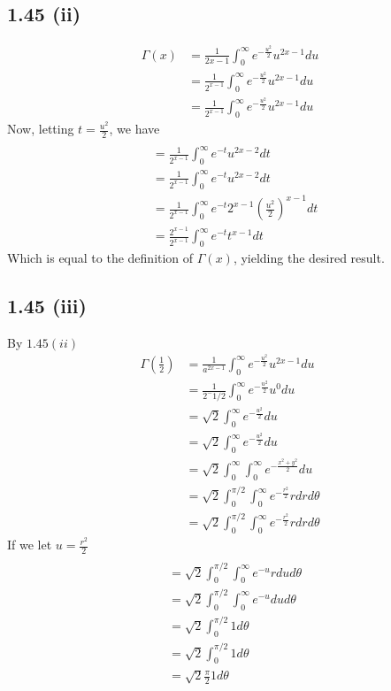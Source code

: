 \documentclass[letterpaper,12pt]{article}
\theoremstyle{definition}
\begin{document}
\subsection*{1.45 (ii)}

\begin{align*}
\Gamma(x) &= \frac{1}{2{x-1}} \int^{\infty}_{0}e^{-\frac{u^2}{2}} u^{2x-1}du
\\&= \frac{1}{2^{x-1}} \int^{\infty}_{0}e^{-\frac{u^2}{2}} u^{2x-1}du
\\&= \frac{1}{2^{x-1}} \int^{\infty}_{0}e^{-\frac{u^2}{2}} u^{2x-1}du
\end{align*}
Now, letting $t = \frac{u^2}{2}$, we have
\begin{align*}
    \\&= \frac{1}{{2^{x-1}}} \int^{\infty}_{0}e^{-t} u^{2x-2}dt
\\&= \frac{1}{2^{x-1}} \int^{\infty}_{0}e^{-t} u^{2x-2}dt
\\&= \frac{1}{2^{x-1}} \int^{\infty}_{0}e^{-t} 2^{x-1} (\frac{u^2}{2})^{x-1}dt
\\&= \frac{2^{x-1}}{2^{x-1}} \int^{\infty}_{0}e^{-t}  t^{x-1}dt
\end{align*}
Which is equal to the definition of $\Gamma(x)$, yielding the desired result.

\subsection*{1.45 (iii)}
By $1.45 (ii)$
\begin{align*}
    \Gamma(\frac{1}{2}) &=\frac{1}{a^{2x-1}} \int^{\infty}_{0}e^{-\frac{u^2}{2}} u^{2x-1}du
    \\&=\frac{1}{2^-1/2} \int^{\infty}_{0}e^{-\frac{u^2}{2}} u^{0}du
    \\&= \sqrt{2} \int^{\infty}_{0}e^{-\frac{u^2}{2}} du
    \\&= \sqrt{2} \int^{\infty}_{0}e^{-\frac{u^2}{2}} du
    \\&= \sqrt{2} \int^{\infty}_{0}\int^{\infty}_{0}e^{-\frac{x^2 +y^2}{2}} du
    \\&= \sqrt{2} \int^{\pi/2}_{0}\int^{\infty}_{0}e^{-\frac{r^2}{2}} r dr d\theta
    \\&= \sqrt{2} \int^{\pi/2}_{0}\int^{\infty}_{0}e^{-\frac{r^2}{2}} r dr d\theta
\end{align*}
If we let $u = \frac{r^2}{2}$
\begin{align*}
    \\&= \sqrt{2} \int^{\pi/2}_{0}\int^{\infty}_{0}e^{-u} r du d\theta
    \\&= \sqrt{2} \int^{\pi/2}_{0}\int^{\infty}_{0}e^{-u}  du d\theta
    \\&= \sqrt{2} \int^{\pi/2}_{0} 1 d\theta
    \\&= \sqrt{2} \int^{\pi/2}_{0} 1 d\theta
    \\&= \sqrt{2} \frac{\pi}{2} 1 d\theta
\end{align*}
\end{document}
